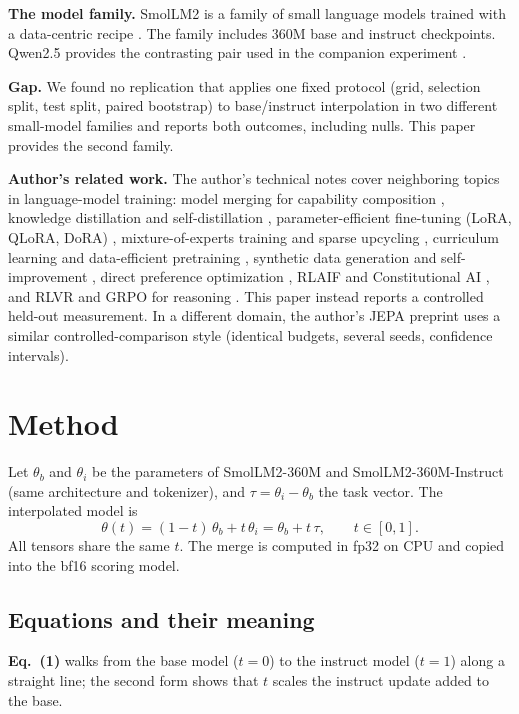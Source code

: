\documentclass[conference]{IEEEtran}
\begin{document}
\textbf{The model family.} SmolLM2 is a family of small language models trained with a data-centric recipe \cite{allal2025smollm2}. The family includes 360M base and instruct checkpoints. Qwen2.5 provides the contrasting pair used in the companion experiment \cite{qwen2024qwen25}.

\textbf{Gap.} We found no replication that applies one fixed protocol (grid, selection split, test split, paired bootstrap) to base/instruct interpolation in two different small-model families and reports both outcomes, including nulls. This paper provides the second family.

\textbf{Author's related work.} The author's technical notes cover neighboring topics in language-model training: model merging for capability composition \cite{santos2026modelmergingfo}, knowledge distillation and self-distillation \cite{santos2026knowledgedisti}, parameter-efficient fine-tuning (LoRA, QLoRA, DoRA) \cite{santos2026parametereffic}, mixture-of-experts training and sparse upcycling \cite{santos2026mixtureofexper}, curriculum learning and data-efficient pretraining \cite{santos2026curriculumlear}, synthetic data generation and self-improvement \cite{santos2026syntheticdatag}, direct preference optimization \cite{santos2026directpreferen}, RLAIF and Constitutional AI \cite{santos2026rlaifandconsti}, and RLVR and GRPO for reasoning \cite{santos2026reinforcementl}. This paper instead reports a controlled held-out measurement. In a different domain, the author's JEPA preprint \cite{santos2026collapseresist} uses a similar controlled-comparison style (identical budgets, several seeds, confidence intervals).

\section{Method}
Let $\theta_b$ and $\theta_i$ be the parameters of SmolLM2-360M and SmolLM2-360M-Instruct (same architecture and tokenizer), and $\tau=\theta_i-\theta_b$ the task vector. The interpolated model is
\begin{equation}
\theta(t)=(1-t)\,\theta_b+t\,\theta_i=\theta_b+t\,\tau,\qquad t\in[0,1].
\end{equation}
All tensors share the same $t$. The merge is computed in fp32 on CPU and copied into the bf16 scoring model.

\subsection*{Equations and their meaning}
\textbf{Eq.~(1)} walks from the base model ($t=0$) to the instruct model ($t=1$) along a straight line; the second form shows that $t$ scales the instruct update added to the base.
\end{document}
